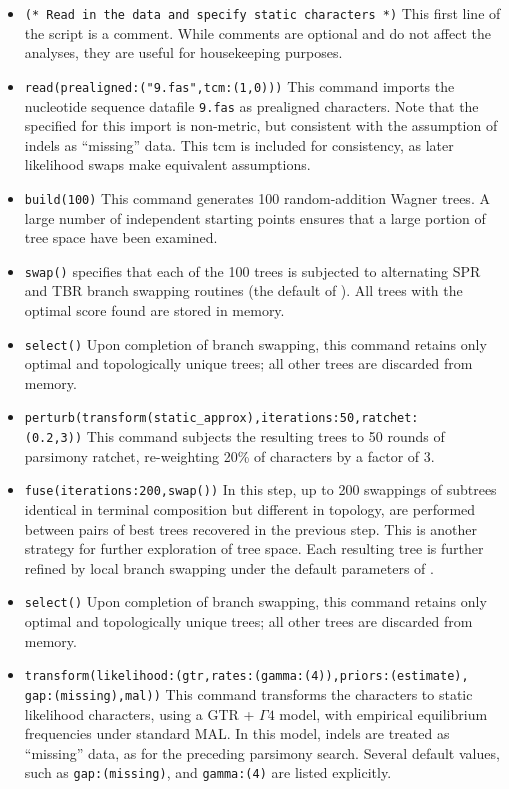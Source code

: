 \begin{itemize}
\item \texttt{(* Read in the data and specify static characters *)} This first line of the script is a comment. While comments are optional and do not affect the analyses, they are useful for housekeeping purposes.
\item \texttt{read(prealigned:("9.fas",tcm:(1,0)))}
This command imports the nucleotide sequence datafile \texttt{9.fas} as prealigned characters. Note that the  specified for this import is non-metric, but consistent with the assumption of indels as ``missing'' data. This tcm is included for consistency, as later likelihood swaps make equivalent assumptions.
\item \texttt{build(100)} This command generates 100 random-addition Wagner trees. A large number of independent starting points ensures that a large portion of tree space have been examined.
\item \texttt{swap()}  specifies that each of the 100 trees is subjected to alternating SPR and TBR branch swapping routines (the default of \poy). All trees with the optimal score found are stored in memory.
\item \texttt{select()} Upon completion of branch swapping, this command retains only optimal and topologically unique trees; all other trees are discarded from memory. 
\item \texttt{perturb(transform(static\_approx),iterations:50,ratchet:\\(0.2,3))} This command subjects the resulting trees to 50 rounds of parsimony ratchet, re-weighting 20\% of characters by a factor of 3.
\item \texttt{fuse(iterations:200,swap())} In this step, up to 200 swappings of subtrees identical in terminal composition but different in topology, are performed between pairs of best trees recovered in the previous step. This is another strategy for further exploration of tree space. Each resulting tree is further refined by local branch swapping under the default parameters of .
\item \texttt{select()} Upon completion of branch swapping, this command retains only optimal and topologically unique trees; all other trees are discarded from memory.
\item \texttt{transform(likelihood:(gtr,rates:(gamma:(4)),priors:(estimate),\\gap:(missing),mal))} This command transforms the characters to static likelihood characters, using a GTR + $\Gamma 4$ model, with empirical equilibrium frequencies under standard MAL. In this model, indels are treated as ``missing'' data, as for the preceding parsimony search. Several default values, such as \texttt{gap:(missing)}, and \texttt{gamma:(4)} are listed explicitly.

\end{itemize}
